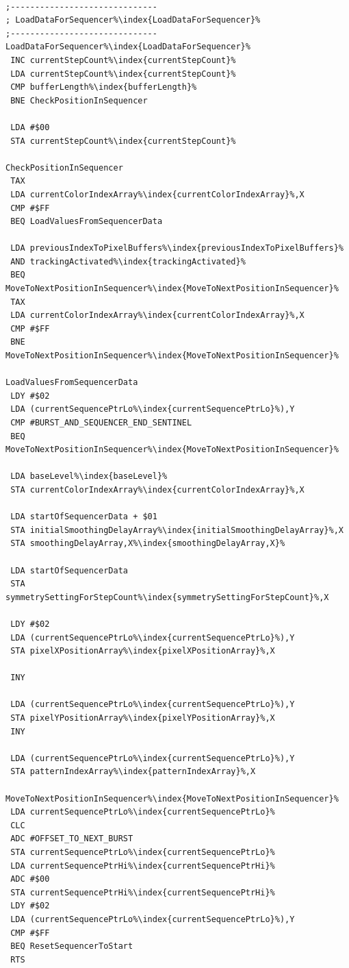 \begin{minipage}[b]{0.33\linewidth}
\begin{lrbox}{\mybox}%
\begin{lstlisting}[basicstyle=\ttfamily\tiny,escapechar=\%]

;------------------------------
; LoadDataForSequencer%\index{LoadDataForSequencer}%
;------------------------------
LoadDataForSequencer%\index{LoadDataForSequencer}%
 INC currentStepCount%\index{currentStepCount}%
 LDA currentStepCount%\index{currentStepCount}%
 CMP bufferLength%\index{bufferLength}%
 BNE CheckPositionInSequencer

 LDA #$00
 STA currentStepCount%\index{currentStepCount}%

CheckPositionInSequencer
 TAX
 LDA currentColorIndexArray%\index{currentColorIndexArray}%,X
 CMP #$FF
 BEQ LoadValuesFromSequencerData

 LDA previousIndexToPixelBuffers%\index{previousIndexToPixelBuffers}%
 AND trackingActivated%\index{trackingActivated}%
 BEQ MoveToNextPositionInSequencer%\index{MoveToNextPositionInSequencer}%
 TAX
 LDA currentColorIndexArray%\index{currentColorIndexArray}%,X
 CMP #$FF
 BNE MoveToNextPositionInSequencer%\index{MoveToNextPositionInSequencer}%

LoadValuesFromSequencerData
 LDY #$02
 LDA (currentSequencePtrLo%\index{currentSequencePtrLo}%),Y
 CMP #BURST_AND_SEQUENCER_END_SENTINEL
 BEQ MoveToNextPositionInSequencer%\index{MoveToNextPositionInSequencer}%

 LDA baseLevel%\index{baseLevel}%
 STA currentColorIndexArray%\index{currentColorIndexArray}%,X

 LDA startOfSequencerData + $01
 STA initialSmoothingDelayArray%\index{initialSmoothingDelayArray}%,X
 STA smoothingDelayArray,X%\index{smoothingDelayArray,X}%

 LDA startOfSequencerData
 STA symmetrySettingForStepCount%\index{symmetrySettingForStepCount}%,X

 LDY #$02
 LDA (currentSequencePtrLo%\index{currentSequencePtrLo}%),Y
 STA pixelXPositionArray%\index{pixelXPositionArray}%,X

 INY

 LDA (currentSequencePtrLo%\index{currentSequencePtrLo}%),Y
 STA pixelYPositionArray%\index{pixelYPositionArray}%,X
 INY

 LDA (currentSequencePtrLo%\index{currentSequencePtrLo}%),Y
 STA patternIndexArray%\index{patternIndexArray}%,X

MoveToNextPositionInSequencer%\index{MoveToNextPositionInSequencer}%
 LDA currentSequencePtrLo%\index{currentSequencePtrLo}%
 CLC
 ADC #OFFSET_TO_NEXT_BURST
 STA currentSequencePtrLo%\index{currentSequencePtrLo}%
 LDA currentSequencePtrHi%\index{currentSequencePtrHi}%
 ADC #$00
 STA currentSequencePtrHi%\index{currentSequencePtrHi}%
 LDY #$02
 LDA (currentSequencePtrLo%\index{currentSequencePtrLo}%),Y
 CMP #$FF
 BEQ ResetSequencerToStart
 RTS


\end{lstlisting}
\end{lrbox}
\end{minipage}
